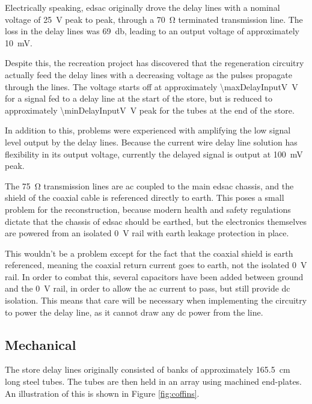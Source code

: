 Electrically speaking, \gls{edsac} originally drove the delay lines with a nominal voltage of \SI{25}{\volt} peak to peak, through a \SI{70}{\ohm} terminated transmission line. The loss in the delay lines was \SI{69}{\decibel}, leading to an output voltage of approximately \SI{10}{\milli\volt}.

Despite this, the recreation project has discovered that the regeneration circuitry actually feed the delay lines with a decreasing voltage as the pulses propagate through the lines. The voltage starts off at approximately \SI{\maxDelayInputV}{\volt} for a signal fed to a delay line at the start of the store, but is reduced to approximately \SI{\minDelayInputV}{\volt} peak for the tubes at the end of the store.

In addition to this, problems were experienced with amplifying the low signal level output by the delay lines. Because the current wire delay line solution has flexibility in its output voltage, currently the delayed signal is output at \SI{100}{\milli\volt} peak.

The \SI{75}{\ohm} transmission lines are \gls{ac} coupled to the main \gls{edsac} chassis, and the shield of the coaxial cable is referenced directly to earth. This poses a small problem for the reconstruction, because modern health and safety regulations dictate that the chassis of \gls{edsac} should be earthed, but the electronics themselves are powered from an isolated \SI{0}{\volt} rail with earth leakage protection in place.

This wouldn't be a problem except for the fact that the coaxial shield is earth referenced, meaning the coaxial return current goes to earth, not the isolated \SI{0}{\volt} rail. In order to combat this, several capacitors have been added between ground and the \SI{0}{\volt} rail, in order to allow the \gls{ac} current to pass, but still provide \gls{dc} isolation. This means that care will be necessary when implementing the circuitry to power the delay line, as it cannot draw any \gls{dc} power from the line.

\subsection{Mechanical} \label{sec:review-delay-mech}
\newcommand{\tubeLenCm}{165.5} %
\newcommand{\tubeOdCm}{4.44} %


The store delay lines originally consisted of banks of approximately \SI{\tubeLenCm}{\centi\metre} long steel tubes. The tubes are then held in an array using machined end-plates. An illustration of this is shown in Figure \ref{fig:coffins}.

